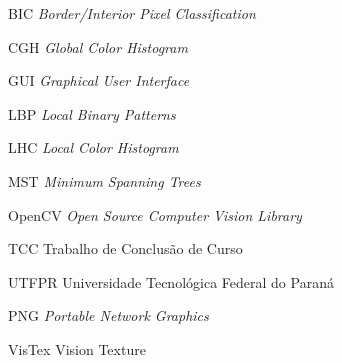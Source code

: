 
\begin{siglas}
    \item[BIC] \textit{Border/Interior Pixel Classification}
    \item[CGH] \textit{Global Color Histogram}
    \item[GUI] \textit{Graphical User Interface}
    \item[LBP] \textit{Local Binary Patterns}
    \item[LHC] \textit{Local Color Histogram}
    \item[MST] \textit{Minimum Spanning Trees}
    \item[OpenCV] \textit{Open Source Computer Vision Library}
    \item[TCC] Trabalho de Conclusão de Curso
    \item[UTFPR] Universidade Tecnológica Federal do Paraná
    \item[PNG] \textit{Portable Network Graphics}
    \item[VisTex] Vision Texture
\end{siglas}

